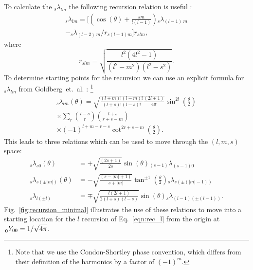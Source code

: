 \documentclass[prd,amsmath,amssymb,floatfix,nofootinbib,superscriptaddress, twocolumn]{revtex4}
\newcommand{\spin}[1]{\,{}_{#1}^{\vphantom{m}}}
\newcommand{\yslm}[3]{\spin{#1} Y_{#2 #3}}
\begin{document}
To calculate the ${}_s \lambda_{lm}$ the following 
recursion relation is useful \cite{Lewis:2001hp}:
%
\begin{multline}
{}_{s} \lambda_{lm} = 
\Bigg[ \left( \cos(\theta) + \frac{s m}{l(l-1)} \right)  {}_s \lambda_{(l-1)\ m} \\
- {}_s \lambda_{(l-2)\ m}/ r_{s (l-1) m} \Bigg]  r_{s l m},
\label{eqn:rec_l}
\end{multline}
%
where 
%
\begin{equation}
r_{slm} = \sqrt{\frac{l^2 (4l^2 - 1)}{ (l^2 - m^2)(l^2 - s^2) }}.
\end{equation}
%
To determine starting points for the recursion we can use an explicit formula for ${}_s \lambda_{l m}$ from Goldberg~et.~al. \cite{goldberg:2155}: \footnote{Note that we use the Condon-Shortley phase convention, which differs from their definition of the harmonics by a factor of $(-1)^{m}$.}
\begin{multline}
{}_{s} \lambda_{l m} (\theta) 
= \sqrt{ \frac{ (l+m)! (l-m)!}{(l+s)!(l-s)!} \frac{(2l+1)}{4\pi} }
\sin^{2l}\left(\frac{\theta}{2}\right) 
\\ \times\sum_{r} {l-s \choose r} 
{l+s \choose r+s-m}
\\ \times (-1)^{l+m-r-s}
\cot^{2r+s-m}\left(\frac{\theta}{2}\right).
\end{multline}
%
This leads to three relations which can be used to move through the $(l,m,s)$ space:
%
\begin{align} 
{}_s \lambda_{s 0}(\theta) &= 
+\sqrt{\frac{(2s+1)}{2s}} \sin(\theta) {}_{(s-1)} \lambda_{(s-1) 0} \tag{A} 
\\ {}_s \lambda_{s (\pm |m|)}(\theta) &= 
-\sqrt{ \frac{(s-|m|+1)}{s+|m|} } \tan^{\pm 1}\left( \frac{\theta}{2} \right) {}_{s} \lambda_{s (\pm (|m|-1))} \tag{B} 
\\ {}_s \lambda_{l (\pm l)} &= 
\mp \sqrt{ \frac{l(2l+1)}{2(l+s)(l-s)} } \sin(\theta) {}_{s} \lambda_{(l-1)(\pm (l - 1))} \tag{C}.
\label{eqn:rec_sm}
\end{align}
%
Fig.~\ref{fig:recursion_minimal} illustrates the use of
these relations to move into a starting location for the $l$
recursion of Eq.~\eqref{eqn:rec_l} from the origin at
$\yslm{0}{0}{0} = 1/\sqrt{4\pi}$. 




\appendix
\end{document}
